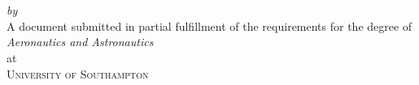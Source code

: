 \begin{titlepage}
  \vspace*{5cm}
  \makeatletter
  \begin{center}
    \begin{Huge}
      \@title
    \end{Huge}\\[0.1cm]
    \begin{Large}
      \@subtitle
    \end{Large}\\
    \emph{by}\\
    \@author \space {}
    \vfill
    A document submitted in partial fulfillment
    of the requirements for the degree of\\
    \emph{Aeronautics and Astronautics}\\
    at\\
    \textsc{University of Southampton}\\
  \end{center}
  \makeatother
\end{titlepage}

\newpage
\null
\thispagestyle{empty}
\newpage

